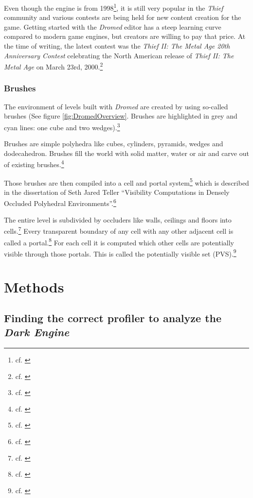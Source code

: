                                                                 
Even though the engine is from 1998\footnote{cf. \cite[p.~172]{grossman2003postmortems}}, it is still very popular in the \textit{Thief} community and various contests are being held for new content creation for the game. Getting started with the \textit{Dromed} editor has a steep learning curve compared to modern game engines, but creators are willing to pay that price. At the time of writing, the latest contest was the \textit{Thief II: The Metal Age 20th Anniversary Contest} celebrating the North American release of \textit{Thief II: The Metal Age} on March 23rd, 2000.\footnote{cf. \cite{20thAnniversaryContest}}

\subsubsection{Brushes}
\label{lab:Brushes}

The environment of levels built with \textit{Dromed} are created by using so-called brushes (See figure \ref{fig:DromedOverview}. Brushes are highlighted in grey and cyan lines: one cube and two wedges).\footnote{cf. \cite{TheRenderingTechnologyThief}}

Brushes are simple polyhedra like cubes, cylinders, pyramids, wedges and dodecahedron. Brushes fill the world with solid matter, water or air and carve out of existing brushes.\footnote{cf. \cite{TheRenderingTechnologyThief}} 

Those brushes are then compiled into a cell and portal system\footnote{cf. \cite{InterviewWithSeanBarrett}} which is described in the dissertation of Seth Jared Teller “Visibility Computations in Densely Occluded Polyhedral Environments”.\footnote{cf. \cite{TheRenderingTechnologyThief}}

The entire level is subdivided by occluders like walls, ceilings and floors into cells.\footnote{cf. \cite[p.3]{Teller:CSD-92-708}} Every transparent boundary of any cell with any other adjacent cell is called a portal.\footnote{cf. \cite[p.3]{Teller:CSD-92-708}} For each cell it is computed which other cells are potentially visible through those portals. This is called the potentially visible set (PVS).\footnote{cf. \cite[p.155]{Teller:CSD-92-708}}

\section{Methods}

\subsection{Finding the correct profiler to analyze the \textit{Dark Engine}}

